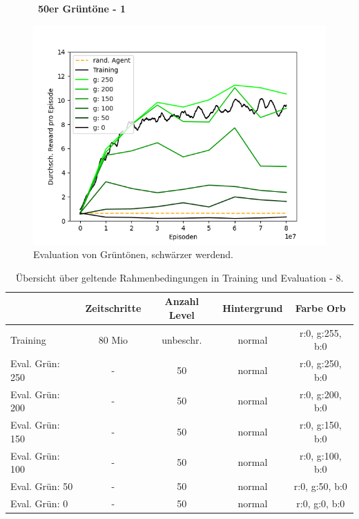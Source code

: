 \begin{figure}[htp!]
   \centering
   \captionsetup{width=0.45\linewidth} 
    \begin{minipage}{0.48\linewidth}
        \centering\
        \textbf{50er Grüntöne - 1}\par\medskip
        \includegraphics[scale=0.5]{abb/_graphen/floor_80mio_inflvl_Training_eval50Green}
        \caption{Evaluation von Grüntönen, schwärzer werdend.}
        \label{fig:floor_80Mio_inflvl_15act_Training_eval50Green}
    \end{minipage}
\end{figure}
\begin{center}
 \begin{table}[htp!]
 \begin{center}
  \begin{tabular}{ l c c c c }
    \hline
		               & Zeitschritte & Anzahl Level & Hintergrund & Farbe Orb \\ \hline \hline
     Training              & 80 Mio       & unbeschr.	  & 	    normal & r:0, g:255, b:0 \\ \hline
     Eval. Grün: 250 	& -	        	   & 50		  & 	    normal 	& r:0, g:250, b:0 \\ \hline
     Eval. Grün: 200 	& -	        	   & 50		  & 	    normal 	& r:0, g:200, b:0 \\ \hline
     Eval. Grün: 150 	& -	        	   & 50		  & 	    normal 	& r:0, g:150, b:0 \\ \hline
     Eval. Grün: 100 	& -	        	   & 50		  & 	    normal 	& r:0, g:100, b:0 \\ \hline
     Eval. Grün: 50 	& -	        	   & 50		  & 	    normal 	& r:0, g:50, b:0 \\ \hline
     Eval. Grün: 0 	& -	        	   & 50		  & 	    normal 	& r:0, g:0, b:0 \\ \hline
    \hline
  \end{tabular}
  \caption{Übersicht über geltende Rahmenbedingungen in Training und Evaluation - 8.}
  \label{tab:tab_durch_EXP_trainSetting8}
  \end{center}
 \end{table}
\end{center} 

